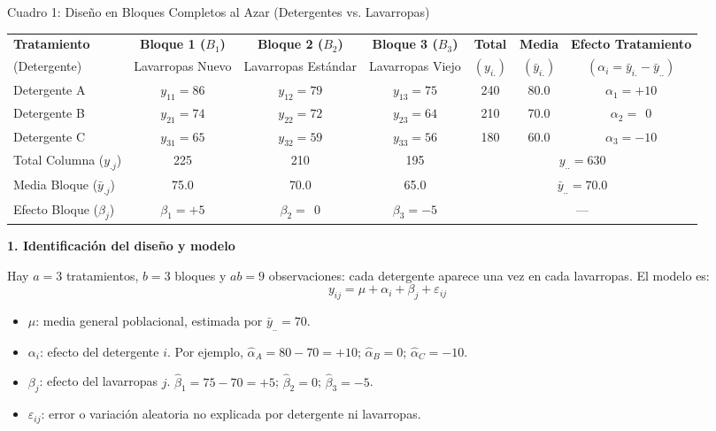\documentclass[10pt,a4paper]{article}
\begin{document}
\begin{center}
{\small Cuadro 1: Diseño en Bloques Completos al Azar (Detergentes vs. Lavarropas)}

\vspace{2pt}
{\footnotesize
\begin{tabular}{l c c c c c c}
\toprule
\textbf{Tratamiento} & \textbf{Bloque 1 ($B_1$)} & \textbf{Bloque 2 ($B_2$)} & \textbf{Bloque 3 ($B_3$)} & \textbf{Total} & \textbf{Media} & \textbf{Efecto Tratamiento} \\
(Detergente) & Lavarropas Nuevo & Lavarropas Estándar & Lavarropas Viejo & $(y_{i.})$ & $(\bar{y}_{i.})$ & $(\alpha_i=\bar{y}_{i.}-\bar{y}_{..})$ \\
\midrule
Detergente A & $y_{11}=86$ & $y_{12}=79$ & $y_{13}=75$ & 240 & 80.0 & $\alpha_1=+10$ \\
Detergente B & $y_{21}=74$ & $y_{22}=72$ & $y_{23}=64$ & 210 & 70.0 & $\alpha_2=\ \ 0$ \\
Detergente C & $y_{31}=65$ & $y_{32}=59$ & $y_{33}=56$ & 180 & 60.0 & $\alpha_3=-10$ \\
\midrule
Total Columna ($y_{.j}$) & 225 & 210 & 195 & \multicolumn{3}{c}{$y_{..}=630$} \\
Media Bloque ($\bar{y}_{.j}$) & 75.0 & 70.0 & 65.0 & \multicolumn{3}{c}{$\bar{y}_{..}=70.0$} \\
Efecto Bloque ($\beta_j$) & $\beta_1=+5$ & $\beta_2=\ \ 0$ & $\beta_3=-5$ & \multicolumn{3}{c}{---} \\
\bottomrule
\end{tabular}
}
\end{center}

\textbf{1. Identificación del diseño y modelo}

Hay $a=3$ tratamientos, $b=3$ bloques y $ab=9$ observaciones: cada detergente aparece una vez en cada lavarropas. El modelo es:
\[
\boxed{y_{ij}=\mu+\alpha_i+\beta_j+\varepsilon_{ij}}
\]
\begin{itemize}[leftmargin=16pt,itemsep=0pt,topsep=1pt,parsep=0pt]
  \item $\mu$: media general poblacional, estimada por $\bar{y}_{..}=70$.
  \item $\alpha_i$: efecto del detergente $i$. Por ejemplo, $\hat{\alpha}_A=80-70=+10$; $\hat{\alpha}_B=0$; $\hat{\alpha}_C=-10$.
  \item $\beta_j$: efecto del lavarropas $j$. $\hat{\beta}_1=75-70=+5$; $\hat{\beta}_2=0$; $\hat{\beta}_3=-5$.
  \item $\varepsilon_{ij}$: error o variación aleatoria no explicada por detergente ni lavarropas.
\end{itemize}
\end{document}
